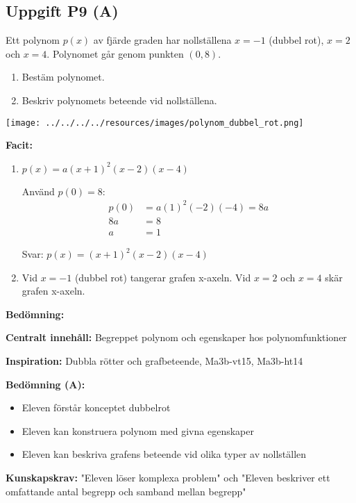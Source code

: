 \documentclass[12pt]{article}
\begin{document}
\subsection*{Uppgift P9 (A)}
Ett polynom $p(x)$ av fjärde graden har nollställena $x = -1$ (dubbel rot), $x = 2$ och $x = 4$. Polynomet går genom punkten $(0, 8)$.
\begin{enumerate}[label=\alph*)]
    \item Bestäm polynomet.
    \item Beskriv polynomets beteende vid nollställena.
\end{enumerate}

\begin{center}
\texttt{[image: ../../../../resources/images/polynom\_dubbel\_rot.png]}
\end{center}

\begin{facitbox}
\textbf{Facit:}

\begin{enumerate}[label=\alph*)]
    \item $p(x) = a(x + 1)^2(x - 2)(x - 4)$
    
    Använd $p(0) = 8$:
    \begin{align*}
    p(0) &= a(1)^2(-2)(-4) = 8a \\
    8a &= 8 \\
    a &= 1
    \end{align*}
    
    Svar: $p(x) = (x + 1)^2(x - 2)(x - 4)$
    
    \item Vid $x = -1$ (dubbel rot) tangerar grafen x-axeln. Vid $x = 2$ och $x = 4$ skär grafen x-axeln.
\end{enumerate}
\end{facitbox}

\begin{refbox}
\textbf{Bedömning:}

\textbf{Centralt innehåll:} Begreppet polynom och egenskaper hos polynomfunktioner

\textbf{Inspiration:} Dubbla rötter och grafbeteende, Ma3b-vt15, Ma3b-ht14

\textbf{Bedömning (A):}
\begin{itemize}
    \item Eleven förstår konceptet dubbelrot
    \item Eleven kan konstruera polynom med givna egenskaper
    \item Eleven kan beskriva grafens beteende vid olika typer av nollställen
\end{itemize}

\textbf{Kunskapskrav:} "Eleven löser komplexa problem" och "Eleven beskriver ett omfattande antal begrepp och samband mellan begrepp"
\end{refbox}
\end{document}
